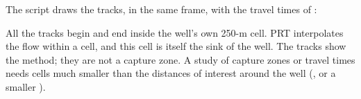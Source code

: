 The script  draws the tracks, in the same frame, with the travel times of :
\begin{note}
All the tracks begin and end inside the well's own 250-m cell. PRT interpolates the flow within a cell, and this cell is
itself the sink of the well. The tracks show the method; they are not a capture zone. A study of capture zones or travel
times needs cells much smaller than the distances of interest around the well (, or a smaller
).
\end{note}

